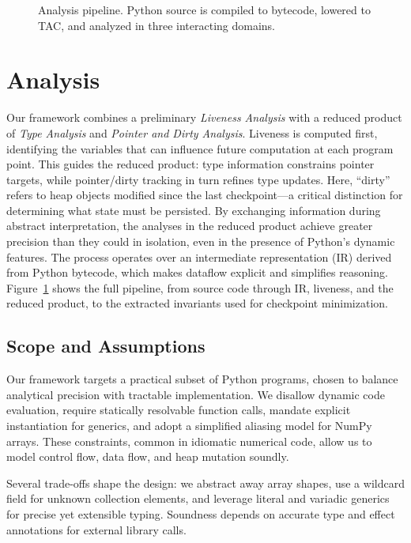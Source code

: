 \begin{figure}[th]
    \centering
    
    \caption{Analysis pipeline. Python source is compiled to bytecode, lowered to TAC, and analyzed in three interacting domains.}
    \label{fig:overview}
\end{figure}

\section{Analysis}
\label{sec:analysis}

Our framework combines a preliminary \emph{Liveness Analysis} with a reduced product of \emph{Type Analysis} and \emph{Pointer and Dirty Analysis}. Liveness is computed first, identifying the variables that can influence future computation at each program point. This guides the reduced product: type information constrains pointer targets, while pointer/dirty tracking in turn refines type updates. Here, ``dirty'' refers to heap objects modified since the last checkpoint—a critical distinction for determining what state must be persisted. By exchanging information during abstract interpretation, the analyses in the reduced product achieve greater precision than they could in isolation, even in the presence of Python’s dynamic features. The process operates over an intermediate representation (IR) derived from Python bytecode, which makes dataflow explicit and simplifies reasoning. Figure~\ref{fig:overview} shows the full pipeline, from source code through IR, liveness, and the reduced product, to the extracted invariants used for checkpoint minimization.


\subsection{Scope and Assumptions}
\label{sec:scope}

Our framework targets a practical subset of Python programs, chosen to balance analytical precision with tractable implementation.  
We disallow dynamic code evaluation, require statically resolvable function calls, mandate explicit instantiation for generics, and adopt a simplified aliasing model for NumPy arrays.  
These constraints, common in idiomatic numerical code, allow us to model control flow, data flow, and heap mutation soundly.

Several trade-offs shape the design: we abstract away array shapes, use a wildcard field for unknown collection elements, and leverage literal and variadic generics for precise yet extensible typing.  
Soundness depends on accurate type and effect annotations for external library calls.  

